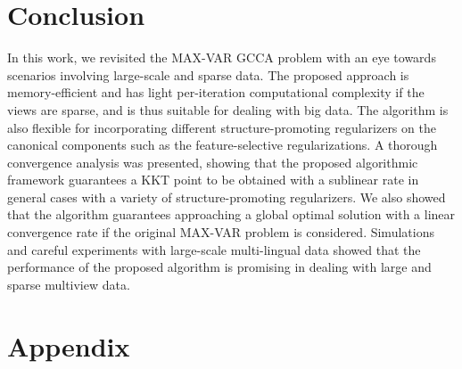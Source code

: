 \documentclass[10pt,journal]{IEEEtran}
\begin{document}
\section{Conclusion}
In this work, we revisited the MAX-VAR GCCA problem with an eye towards scenarios involving large-scale and sparse data. 
The proposed approach is memory-efficient and has light per-iteration computational complexity if the views are sparse, and is thus suitable for dealing with big data.
The algorithm is also flexible for incorporating different structure-promoting regularizers on the canonical components such as the feature-selective regularizations.
A thorough convergence analysis was presented, showing that the proposed algorithmic framework
guarantees a KKT point to be obtained with a sublinear rate in general cases with a variety of structure-promoting regularizers.
We also showed that the algorithm guarantees approaching a global optimal solution with a linear convergence rate if the original MAX-VAR problem is considered.
Simulations and careful experiments with large-scale multi-lingual data showed that the performance of the proposed algorithm is promising in dealing with large and sparse multiview data.



\ifplainver
    \section*{Appendix}
    \renewcommand{\thesubsection}{\Alph{subsection}}
\else
\appendices
\fi
\end{document}
